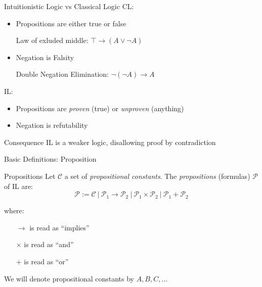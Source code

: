 \documentclass{beamer}
\begin{document}
\begin{frame}{Intuitionistic Logic vs Classical Logic}
	\alert{CL}:
	\begin{itemize}
		\item Propositions are either true or false
		\item[] \quad 
			\small{\alert{Law of exluded middle}:
				$\top \to (A \vee \neg A)$
			}
		\item Negation is Falsity
		\item[] \quad 
			\small{\alert{Double Negation Elimination}:
				$\neg (\neg A) \to A$
			}
	\end{itemize}
	\vfill
	\pause
	
	\alert{IL}:
	\begin{itemize}
		\item Propositions are \textit{proven} (true) or \textit{unproven} (anything)
		\item Negation is refutability
	\end{itemize}
	\vfill
	
	\pause
	\begin{block}{Consequence}
		IL is a \alert{weaker} logic, disallowing proof by contradiction
	\end{block}	
	
\end{frame}

%

\begin{frame}{Basic Definitions: Proposition}

	\begin{block}{Propositions}
		Let $\mathcal{C}$ a set of \textit{propositional constants}.
		The \textit{propositions} (formulas) $\mathcal{P}$ of IL are:
		\[
		\mathcal{P} := \mathcal{C}  \ | \ \mathcal{P}_1 \to \mathcal{P}_2 \ | \ \mathcal{P}_1 \times \mathcal{P}_2 \
		| \ \mathcal{P}_1 + \mathcal{P}_2
		\]
	
	where:
	\begin{itemize}
		\item[$\to$] is read as ``implies''
		\item[$\times$] is read as ``and''
		\item[$+$] is read as ``or''
	\end{itemize}
	\end{block}
	
	\begin{flushright}
		\small
		We will denote propositional constants by $A, B, C, \dots$
	\end{flushright}
\end{frame}
\end{document}
